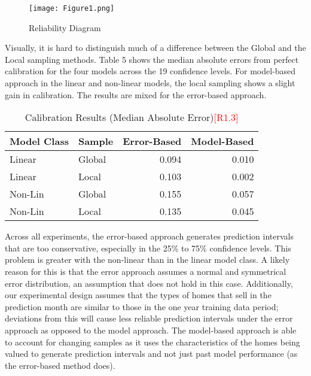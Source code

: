 \documentclass[colTwo]{anon}
\theoremstyle{definition}
\begin{document}
\begin{figure}[h!]
\centering
\texttt{[image: Figure1.png]}
\caption{Reliability Diagram}
\label{fig:reliability}
\end{figure}

Visually, it is hard to distinguish much of a difference between the Global and the Local sampling methods.  Table 5 shows the median absolute errors from perfect calibration for the four models across the 19 confidence levels.  For model-based approach in the linear and non-linear models, the local sampling shows a slight gain in calibration.  The results are mixed for the error-based approach.

\begin{table}[h]
\centering
\begin{tabular}{l|l|r|r}
\hline
\textbf{Model Class} & \textbf{Sample} & \textbf{Error-Based} & \textbf{Model-Based}\\
\hline
Linear & Global & 0.094 & 0.010\\
Linear & Local & 0.103 & 0.002\\
\hline
Non-Lin & Global & 0.155 & 0.057\\
Non-Lin & Local & 0.135 & 0.045\\
\hline
\end{tabular}
\caption{Calibration Results (Median Absolute Error)\textcolor{red}{[R1.3]}}
\label{table:5}
\end{table}


Across all experiments, the error-based approach generates prediction intervals that are too conservative, especially in the 25\% to 75\% confidence levels.  This problem is greater with the non-linear than in the linear model class.  A likely reason for this is that the error approach assumes a normal and symmetrical error distribution, an assumption that does not hold in this case.  Additionally, our experimental design assumes that the types of homes that sell in the prediction month are similar to those in the one year training data period; deviations from this will cause less reliable prediction intervals under the error approach as opposed to the model approach.  The model-based approach is able to account for changing samples as it uses the characteristics of the homes being valued to generate prediction intervals and not just past model performance (as the error-based method does). 
\end{document}
